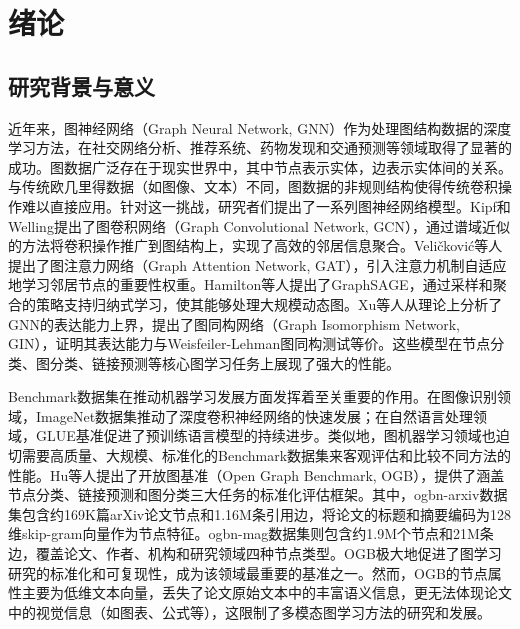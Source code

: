 
\chapter{绪论}

\section{研究背景与意义}

近年来，图神经网络（Graph Neural Network, GNN）作为处理图结构数据的深度学习方法，在社交网络分析\cite{hamilton2017rep_survey}、推荐系统、药物发现和交通预测等领域取得了显著的成功。图数据广泛存在于现实世界中，其中节点表示实体，边表示实体间的关系。与传统欧几里得数据（如图像、文本）不同，图数据的非规则结构使得传统卷积操作难以直接应用。针对这一挑战，研究者们提出了一系列图神经网络模型。Kipf和Welling\cite{kipf2017gcn}提出了图卷积网络（Graph Convolutional Network, GCN），通过谱域近似的方法将卷积操作推广到图结构上，实现了高效的邻居信息聚合。Veli\v{c}kovi\'{c}等人\cite{velickovic2018gat}提出了图注意力网络（Graph Attention Network, GAT），引入注意力机制自适应地学习邻居节点的重要性权重。Hamilton等人\cite{hamilton2017graphsage}提出了GraphSAGE，通过采样和聚合的策略支持归纳式学习，使其能够处理大规模动态图。Xu等人\cite{xu2019gin}从理论上分析了GNN的表达能力上界，提出了图同构网络（Graph Isomorphism Network, GIN），证明其表达能力与Weisfeiler-Lehman图同构测试等价。这些模型在节点分类、图分类、链接预测等核心图学习任务上展现了强大的性能\cite{zhou2020gnn_survey, wu2021gnn_survey}。

Benchmark数据集在推动机器学习发展方面发挥着至关重要的作用。在图像识别领域，ImageNet数据集推动了深度卷积神经网络的快速发展；在自然语言处理领域，GLUE基准促进了预训练语言模型的持续进步。类似地，图机器学习领域也迫切需要高质量、大规模、标准化的Benchmark数据集来客观评估和比较不同方法的性能。Hu等人\cite{hu2020ogb}提出了开放图基准（Open Graph Benchmark, OGB），提供了涵盖节点分类、链接预测和图分类三大任务的标准化评估框架。其中，ogbn-arxiv数据集包含约169K篇arXiv论文节点和1.16M条引用边，将论文的标题和摘要编码为128维skip-gram向量作为节点特征。ogbn-mag数据集则包含约1.9M个节点和21M条边，覆盖论文、作者、机构和研究领域四种节点类型。OGB极大地促进了图学习研究的标准化和可复现性，成为该领域最重要的基准之一。然而，OGB的节点属性主要为低维文本向量，丢失了论文原始文本中的丰富语义信息，更无法体现论文中的视觉信息（如图表、公式等），这限制了多模态图学习方法的研究和发展。

